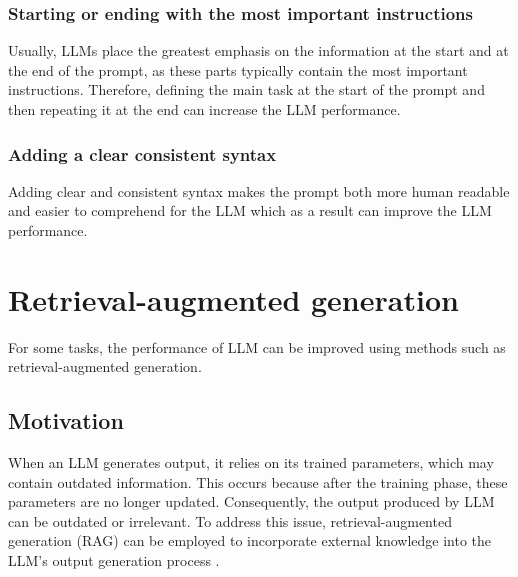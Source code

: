\subsubsection{Starting or ending with the most important instructions}

Usually, LLMs place the greatest emphasis on the information at the start and at the end of the prompt, as these parts typically contain the most important instructions. Therefore, defining the main task at the start of the prompt and then repeating it at the end can increase the LLM performance.


\subsubsection{Adding a clear consistent syntax}

Adding clear and consistent syntax makes the prompt both more human readable and easier to comprehend for the LLM which as a result can improve the LLM performance.



\section{Retrieval-augmented generation}

For some tasks, the performance of LLM can be improved using methods such as retrieval-augmented generation.


\subsection{Motivation}

When an LLM generates output, it relies on its trained parameters, which may contain outdated information. This occurs because after the training phase, these parameters are no longer updated. Consequently, the output produced by LLM can be outdated or irrelevant. To address this issue, retrieval-augmented generation (RAG) can be employed to incorporate external knowledge into the LLM's output generation process \cite{Gao2023}.



